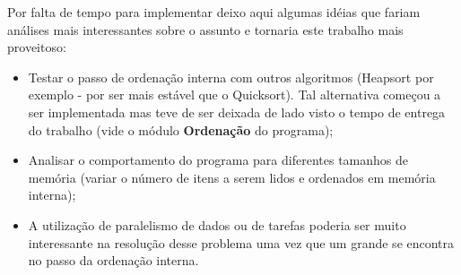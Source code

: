 \documentclass[12pt]{article}
\begin{document}
Por falta de tempo para implementar deixo aqui algumas idéias que fariam análises mais interessantes sobre o assunto e tornaria este trabalho mais proveitoso:
\begin{itemize}
\item Testar o passo de ordenação interna com outros algoritmos (Heapsort por exemplo - por
ser mais estável que o Quicksort). Tal alternativa começou a ser implementada mas teve de ser deixada de lado visto o tempo de entrega do trabalho (vide o módulo \textbf{Ordenação} do programa);
\item Analisar o comportamento do programa para diferentes tamanhos de memória (variar o 
número de itens a serem lidos e ordenados em memória interna);
\item A utilização de paralelismo de dados ou de tarefas poderia ser muito interessante na resolução desse problema uma vez que um grande se encontra no passo da ordenação interna.
\end{itemize}
\end{document}
